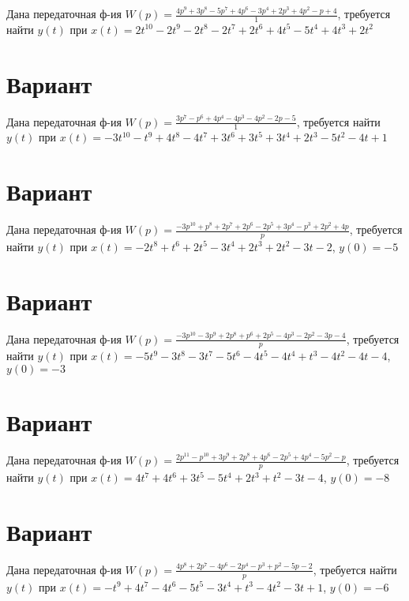 \documentclass{article}
\begin{document}
Дана передаточная ф-ия $W(p)=\frac{4p^{9}+3p^{8}-5p^{7}+4p^{6}-3p^{4}+2p^{3}+4p^{2}-p+4}{1}$, требуется найти $y(t)$ при $x(t)=2t^{10}-2t^{9}-2t^{8}-2t^{7}+2t^{6}+4t^{5}-5t^{4}+4t^{3}+2t^{2}$



\section{Вариант}

Дана передаточная ф-ия $W(p)=\frac{3p^{7}-p^{6}+4p^{4}-4p^{3}-4p^{2}-2p-5}{1}$, требуется найти $y(t)$ при $x(t)=-3t^{10}-t^{9}+4t^{8}-4t^{7}+3t^{6}+3t^{5}+3t^{4}+2t^{3}-5t^{2}-4t+1$



\section{Вариант}

Дана передаточная ф-ия $W(p)=\frac{-3p^{10}+p^{8}+2p^{7}+2p^{6}-2p^{5}+3p^{4}-p^{3}+2p^{2}+4p}{p}$, требуется найти $y(t)$ при $x(t)=-2t^{8}+t^{6}+2t^{5}-3t^{4}+2t^{3}+2t^{2}-3t-2$, $y(0)=-5$



\section{Вариант}

Дана передаточная ф-ия $W(p)=\frac{-3p^{10}-3p^{9}+2p^{8}+p^{6}+2p^{5}-4p^{3}-2p^{2}-3p-4}{p}$, требуется найти $y(t)$ при $x(t)=-5t^{9}-3t^{8}-3t^{7}-5t^{6}-4t^{5}-4t^{4}+t^{3}-4t^{2}-4t-4$, $y(0)=-3$



\section{Вариант}

Дана передаточная ф-ия $W(p)=\frac{2p^{11}-p^{10}+3p^{9}+2p^{8}+4p^{6}-2p^{5}+4p^{4}-5p^{2}-p}{p}$, требуется найти $y(t)$ при $x(t)=4t^{7}+4t^{6}+3t^{5}-5t^{4}+2t^{3}+t^{2}-3t-4$, $y(0)=-8$



\section{Вариант}

Дана передаточная ф-ия $W(p)=\frac{4p^{8}+2p^{7}-4p^{6}-2p^{4}-p^{3}+p^{2}-5p-2}{p}$, требуется найти $y(t)$ при $x(t)=-t^{9}+4t^{7}-4t^{6}-5t^{5}-3t^{4}+t^{3}-4t^{2}-3t+1$, $y(0)=-6$
\end{document}
